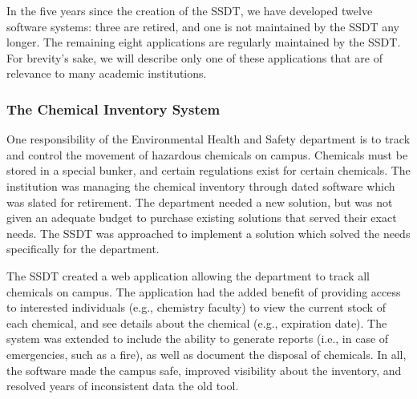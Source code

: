 In the five years since the creation of the SSDT, we have developed twelve software systems: three are retired, and one is not maintained by the SSDT any longer. The remaining eight applications are regularly maintained by the SSDT. For brevity's sake, we will describe only one of these applications that are of relevance to many academic institutions.



\subsubsection{The Chemical Inventory System} %
One responsibility of the Environmental Health and Safety department is to track and control the movement of hazardous chemicals on campus. Chemicals must be stored in a special bunker, and certain regulations exist for certain chemicals. The institution was managing the chemical inventory through dated software which was slated for retirement. The department needed a new solution, but was not given an adequate budget to purchase existing solutions that served their exact needs. The SSDT was approached to implement a solution which solved the needs specifically for the department. 

The SSDT created a web application allowing the department to track all chemicals on campus. The application had the added benefit of providing access to interested individuals (e.g., chemistry faculty) to view the current stock of each chemical, and see details about the chemical (e.g., expiration date). The system was extended to include the ability to generate reports (i.e., in case of emergencies, such as a fire), as well as document the disposal of chemicals. In all, the software made the campus safe, improved visibility about the inventory, and resolved years of inconsistent data the old tool.

